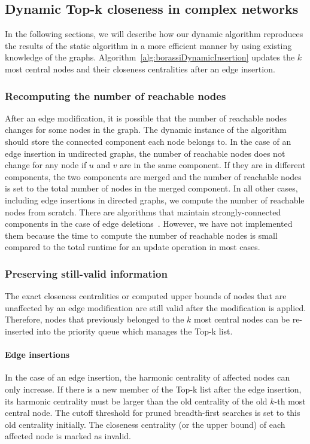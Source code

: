 \subsection{Dynamic Top-k closeness in complex networks}
In the following sections, we will describe how our dynamic algorithm reproduces the results of the static algorithm in a more efficient manner by using existing knowledge of the graphs. Algorithm~\ref{alg:borassiDynamicInsertion} updates the $k$ most central nodes and their closeness centralities after an edge insertion.
\subsubsection{Recomputing the number of reachable nodes}
After an edge modification, it is possible that the number of reachable nodes changes for some nodes in the graph. The dynamic instance of the algorithm should store the connected component each node belongs to. In the case of an edge insertion in undirected graphs, the number of reachable nodes does not change for any node if $u$ and $v$ are in the same component. If they are in different components, the two components are merged and the number of reachable nodes is set to the total number of nodes in the merged component. In all other cases, including edge insertions in directed graphs, we compute the number of reachable nodes from scratch. There are algorithms that maintain strongly-connected components in the case of edge deletions~\cite{lkacki2013improved,chechik2016decremental}. However, we have not implemented them because the time to compute the number of reachable nodes is small compared to the total runtime for an update operation in most cases.

\subsubsection{Preserving still-valid information}
The exact closeness centralities or computed upper bounds of nodes that are unaffected by an edge modification are still valid after the modification is applied. Therefore, nodes that previously belonged to the $k$ most central nodes can be re-inserted into the priority queue which manages the Top-k list.

\paragraph{Edge insertions}
In the case of an edge insertion, the harmonic centrality of affected nodes can only increase. If there is a new member of the Top-k list after the edge insertion, its harmonic centrality must be larger than the old centrality of the old $k$-th most central node. The cutoff threshold for pruned breadth-first searches is set to this old centrality initially. The closeness centrality (or the upper bound) of each affected node is marked as invalid. 

